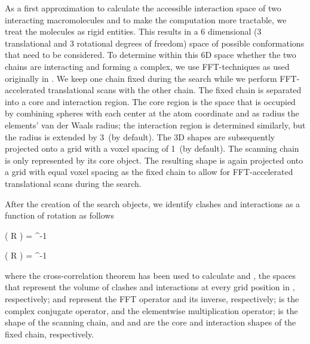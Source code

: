 As a first approximation to calculate the accessible interaction space of two
interacting macromolecules and to make the computation more tractable, we treat
the molecules as rigid entities. This results in a 6 dimensional (3
translational and 3 rotational degrees of freedom) space of possible
conformations that need to be considered. To determine within this 6D space
whether the two chains are interacting and forming a complex, we use
FFT-techniques as used originally in \citeauthor{Katchalski-Katzir1992}.
We keep one chain fixed during the search while we perform FFT-accelerated
translational scans with the other chain. The fixed chain is separated into a
core and interaction region. The core region is the space that is occupied by
combining spheres with each center at the atom coordinate and as radius the
elements’ van der Waals radius; the interaction region is determined similarly,
but the radius is extended by 3\Angstrom\ (by default). The 3D shapes are subsequently
projected onto a grid with a voxel spacing of 1\Angstrom\ (by default). The scanning
chain is only represented by its core object. The resulting shape is again
projected onto a grid with equal voxel spacing as the fixed chain to allow for
FFT-accelerated translational scans during the search.

After the creation of the search objects, we identify clashes and interactions
as a function of rotation  as follows

\startformula
\boldC \left( R \right) = ^{-1} 
\stopformula

\startformula
\boldI \left( R \right) = ^{-1} 
\stopformula

where the cross-correlation theorem has been used to calculate \m{\boldC} and
\m{\boldI}, the spaces that represent the volume of clashes and interactions at
every grid position in \Angstrom{}, respectively;  and
 represent the FFT operator and its inverse, respectively; \high{*}
is the complex conjugate operator, and \m{\times} the elementwise multiplication
operator; \m{\boldS} is the shape of the scanning chain, and  and  are the core and interaction
shapes of the fixed chain, respectively.

